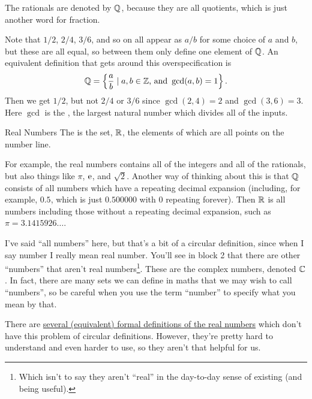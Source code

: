 \documentclass[fleqn]{LectureClass/LectureClass}
\begin{document}
    \begin{remark}{}{}
        The rationals are denoted by \(\mathbb{Q}\), because they are all quotients, which is just another word for fraction.
    \end{remark}
    
    Note that \(1/2\), \(2/4\), \(3/6\), and so on all appear as \(a/b\) for some choice of \(a\) and \(b\), but these are all equal, so between them only define one element of \(\mathbb{Q}\).
    An equivalent definition that gets around this overspecification is
    \begin{equation}
        \mathbb{Q} = \left\{ \frac{a}{b} \mid a, b \in \mathbb{Z} \text{, and } \gcd(a, b) = 1 \right\}.
    \end{equation}
    Then we get \(1/2\), but not \(2/4\) or \(3/6\) since \(\gcd(2, 4) = 2\) and \(\gcd(3, 6) = 3\).
    Here \(\gcd\) is the , the largest natural number which divides all of the inputs.
    
    \begin{dfn}{Real Numbers}{}
        The  is the set, \(\mathbb{R}\), the elements of which are all points on the number line.
    \end{dfn}
    
    For example, the real numbers contains all of the integers and all of the rationals, but also things like \(\pi\), \(\mathrm{e}\), and \(\sqrt{2}\).
    Another way of thinking about this is that \(\mathbb{Q}\) consists of all numbers which have a repeating decimal expansion (including, for example, \(0.5\), which is just \(0.500000\) with \(0\) repeating forever).
    Then \(\mathbb{R}\) is all numbers including those without a repeating decimal expansion, such as \(\pi = 3.1415926\ldots\).
    
    \begin{remark}{}{}
        I've said \enquote{all numbers} here, but that's a bit of a circular definition, since when I say number I really mean real number.
        You'll see in block 2 that there are other \enquote{numbers} that aren't real numbers\footnote{Which isn't to say they aren't \enquote{real} in the day-to-day sense of existing (and being useful).}.
        These are the complex numbers, denoted \(\mathbb{C}\).
        In fact, there are many sets we can define in maths that we may wish to call \enquote{numbers}, so be careful when you use the term \enquote{number} to specify what you mean by that.
        
        There are \href{https://en.wikipedia.org/wiki/Construction_of_the_real_numbers}{several (equivalent) formal definitions of the real numbers} which don't have this problem of circular definitions.
        However, they're pretty hard to understand and even harder to use, so they aren't that helpful for us.
    \end{remark}
    
\end{document}
